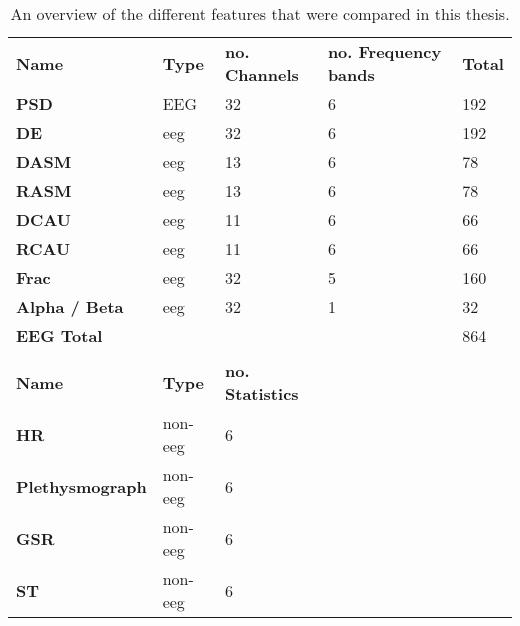 \begin{table}[H]
\centering
\caption{An overview of the different features that were compared in this thesis.\label{featOverviewTable}}
\begin{tabular}{lllll}
\textbf{Name}           & \textbf{Type} & \textbf{no. Channels}   & \textbf{no. Frequency bands} & \textbf{Total} \\
\textbf{PSD}            & EEG           & 32                            & 6                         & 192          \\
\textbf{DE}             & eeg           & 32                            & 6                         & 192          \\
\textbf{DASM}           & eeg           & 13                            & 6                         & 78           \\
\textbf{RASM}           & eeg           & 13                            & 6                         & 78           \\
\textbf{DCAU}           & eeg           & 11                            & 6                         & 66           \\
\textbf{RCAU}           & eeg  & 11                            & 6                         & 66           \\
\textbf{Frac}           & eeg           & 32                            & 5                         & 160          \\
\textbf{Alpha / Beta}   & eeg           & 32                            & 1                         & 32           \\
\textbf{EEG Total}      &               &                               &                           & 864          \\
                        &               &                               &                           &              \\
\textbf{Name}           & \textbf{Type} & \textbf{no. Statistics} &                          &              \\
\textbf{HR}             & non-eeg       & 6                             &                           &              \\
\textbf{Plethysmograph} & non-eeg       & 6                             &                           &              \\
\textbf{GSR}            & non-eeg       & 6                             &                           &              \\
\textbf{ST}             & non-eeg       & 6                             &                           &              \\

\end{tabular}
\end{table}
